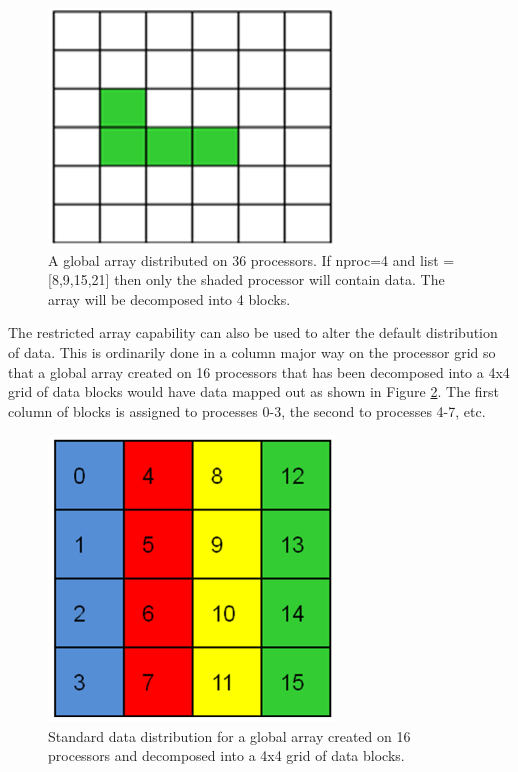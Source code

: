 %
\begin{figure}
\begin{centering}
\includegraphics[width=3in]{GAon36Processors}
\par\end{centering}

\caption{\label{cap:GA-36Processors}A global array distributed on 36 processors.
If nproc=4 and list = {[}8,9,15,21{]} then only the shaded processor
will contain data. The array will be decomposed into 4 blocks. }

\end{figure}


The restricted array capability can also be used to alter the default
distribution of data. This is ordinarily done in a column major way
on the processor grid so that a global array created on 16 processors
that has been decomposed into a 4x4 grid of data blocks would have
data mapped out as shown in Figure \ref{fig:GA-16-Standard-data-distribution}.
The first column of blocks is assigned to processes 0-3, the second
to processes 4-7, etc. 

%
\begin{figure}
\begin{centering}
\includegraphics[width=3in]{GAon16Processors}
\par\end{centering}

\caption{\label{fig:GA-16-Standard-data-distribution}Standard data distribution
for a global array created on 16 processors and decomposed into a
4x4 grid of data blocks. }



\end{figure}


